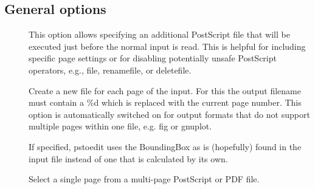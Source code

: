 \documentclass[english,a4paper]{article}
\begin{document}
\subsection{General options}
\begin{description}
\item[]
This option allows specifying an additional PostScript file that will be executed just before the normal input is read. This is helpful for including specific page settings or for disabling potentially unsafe PostScript operators, e.g., file, renamefile, or deletefile.


\item[]



\item[]



\item[]



\item[]



\item[]



\item[]



\item[]



\item[]
Create a new file for each page of the input. For this the output filename must contain a \%d which is replaced with the current page number. This option is automatically switched on for output formats that do not support multiple pages within one file, e.g. fig or gnuplot.


\item[]
If specified, pstoedit uses the BoundingBox as is (hopefully) found in the input file instead of one that is calculated by its own.


\item[]
Select a single page from a multi-page PostScript or PDF file.



\end{description}
\end{document}
